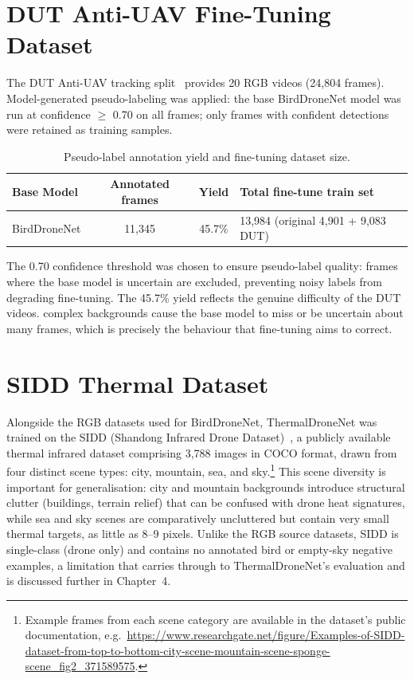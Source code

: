 \documentclass[12pt,a4paper]{report}
\renewcommand{\arraystretch}{1.1}
\begin{document}
\section{DUT Anti-UAV Fine-Tuning Dataset}
\label{sec:dut_finetune_dataset}

The DUT Anti-UAV tracking split~\cite{dutantiuav2022} provides 20 RGB
videos (24,804 frames). Model-generated pseudo-labeling was applied:
the base BirdDroneNet model was run at confidence $\geq$ 0.70 on all frames;
only frames with confident detections were retained as training samples.

\begin{table}[H]
\centering
\caption[Pseudo-label annotation yield]{Pseudo-label annotation yield and fine-tuning dataset size.}
\renewcommand{\arraystretch}{0.9}
\begin{tabular}{|l|c|c|p{5cm}|}
\hline
\rowcolor{gray!20}
\textbf{Base Model} & \textbf{Annotated frames} & \textbf{Yield} & \textbf{Total fine-tune train set} \\
\hline
BirdDroneNet & 11,345 & 45.7\% & 13,984 (original 4,901 + 9,083 DUT) \\
\hline
\end{tabular}
\end{table}

The 0.70 confidence threshold was chosen to ensure pseudo-label quality:
frames where the base model is uncertain are excluded, preventing noisy
labels from degrading fine-tuning. The 45.7\% yield reflects the genuine
difficulty of the DUT videos. complex backgrounds cause the base model
to miss or be uncertain about many frames, which is precisely the behaviour
that fine-tuning aims to correct.

\section{SIDD Thermal Dataset}
\label{sec:sidd_dataset}

Alongside the RGB datasets used for BirdDroneNet, ThermalDroneNet was
trained on the SIDD (Shandong Infrared Drone Dataset)~\cite{sidd2023}, a
publicly available thermal infrared dataset comprising 3,788 images
in COCO format, drawn from four distinct scene types: city, mountain,
sea, and sky.\footnote{Example frames from each scene category are
available in the dataset's public documentation, e.g.\
\url{https://www.researchgate.net/figure/Examples-of-SIDD-dataset-from-top-to-bottom-city-scene-mountain-scene-sponge-scene_fig2_371589575}.}
This scene diversity is important for generalisation: city and mountain
backgrounds introduce structural clutter (buildings, terrain relief) that
can be confused with drone heat signatures, while sea and sky scenes are
comparatively uncluttered but contain very small thermal targets, as
little as 8--9 pixels. Unlike the RGB source datasets, SIDD is single-class
(drone only) and contains no annotated bird or empty-sky negative
examples, a limitation that carries through to ThermalDroneNet's
evaluation and is discussed further in Chapter~4.
\end{document}
